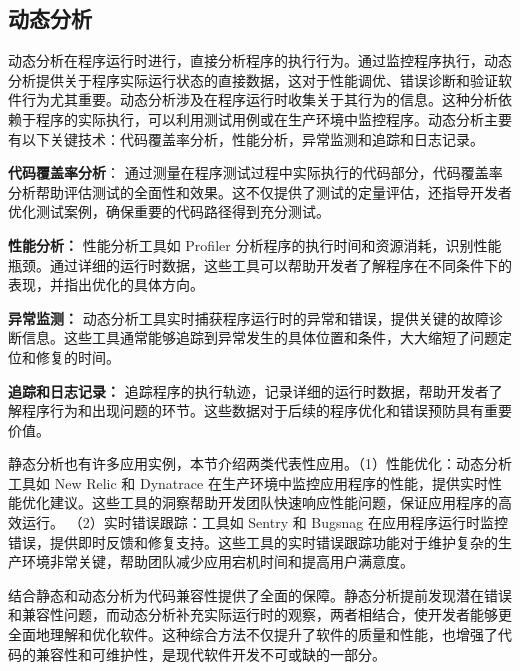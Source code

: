 \subsection{动态分析}
动态分析在程序运行时进行，直接分析程序的执行行为。通过监控程序执行，动态分析提供关于程序实际运行状态的直接数据，这对于性能调优、错误诊断和验证软件行为尤其重要。动态分析涉及在程序运行时收集关于其行为的信息。这种分析依赖于程序的实际执行，可以利用测试用例或在生产环境中监控程序。动态分析主要有以下关键技术：代码覆盖率分析，性能分析，异常监测和追踪和日志记录。

\textbf{代码覆盖率分析}： 通过测量在程序测试过程中实际执行的代码部分，代码覆盖率分析帮助评估测试的全面性和效果。这不仅提供了测试的定量评估，还指导开发者优化测试案例，确保重要的代码路径得到充分测试。

\textbf{性能分析：} 性能分析工具如 Profiler 分析程序的执行时间和资源消耗，识别性能瓶颈。通过详细的运行时数据，这些工具可以帮助开发者了解程序在不同条件下的表现，并指出优化的具体方向。

\textbf{异常监测：} 动态分析工具实时捕获程序运行时的异常和错误，提供关键的故障诊断信息。这些工具通常能够追踪到异常发生的具体位置和条件，大大缩短了问题定位和修复的时间。

\textbf{追踪和日志记录：} 追踪程序的执行轨迹，记录详细的运行时数据，帮助开发者了解程序行为和出现问题的环节。这些数据对于后续的程序优化和错误预防具有重要价值。

静态分析也有许多应用实例，本节介绍两类代表性应用。（1）性能优化：动态分析工具如 New Relic 和 Dynatrace 在生产环境中监控应用程序的性能，提供实时性能优化建议。这些工具的洞察帮助开发团队快速响应性能问题，保证应用程序的高效运行。
（2）实时错误跟踪：工具如 Sentry 和 Bugsnag 在应用程序运行时监控错误，提供即时反馈和修复支持。这些工具的实时错误跟踪功能对于维护复杂的生产环境非常关键，帮助团队减少应用宕机时间和提高用户满意度。

结合静态和动态分析为代码兼容性提供了全面的保障。静态分析提前发现潜在错误和兼容性问题，而动态分析补充实际运行时的观察，两者相结合，使开发者能够更全面地理解和优化软件。这种综合方法不仅提升了软件的质量和性能，也增强了代码的兼容性和可维护性，是现代软件开发不可或缺的一部分。
